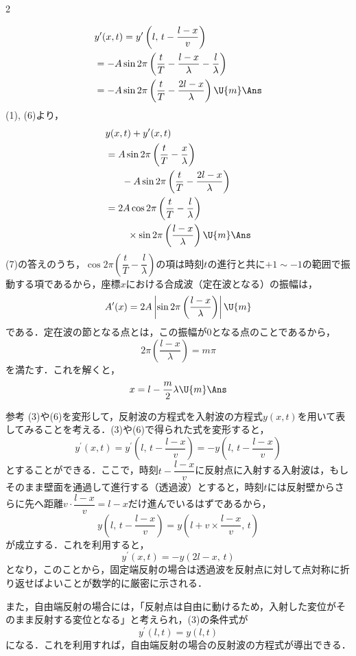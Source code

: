 \begin{multicols}{2}
\begin{komon}
       \[\begin{aligned}&y^\prime(x,t)=y^\prime\left(l,\,t-\frac{l-x}{v}\right)\\&=-A\sin 2\pi\left(\frac{t}{T}-\frac{l-x}{\lambda}-\frac{l}{\lambda}\right)\\&=-A\sin 2\pi\left(\frac{t}{T}-\frac{2l-x}{\lambda}\right)\U{m}\Ans\end{aligned}\]
 (1), (6)より，
       \[\begin{aligned}&y(x,t)+y^\prime(x,t)\\&=A\sin 2\pi\left(\frac{t}{T}-\frac{x}{\lambda}\right)\\&\hspace{6mm}-A\sin 2\pi\left(\frac{t}{T}-\frac{2l-x}{\lambda}\right)\\&=2A\cos 2\pi\left(\frac{t}{T}-\frac{l}{\lambda}\right)\\&\hspace{8mm}\times\sin 2\pi\left(\frac{l-x}{\lambda}\right)\U{m}\Ans\end{aligned}\]
 (7)の答えのうち，$\cos 2\pi\left(\dfrac{t}{T}-\dfrac{l}{\lambda}\right)$の項は時刻$t$の進行と共に$+1\sim-1$の範囲で振動する項であるから，座標$x$における合成波（定在波となる）の振幅は，
       \[A^\prime(x)=2A\left|\sin 2\pi\left(\frac{l-x}{\lambda}\right)\right|\U{m}\]
       である．定在波の節となる点とは，この振幅が0となる点のことであるから，
       \[2\pi\left(\frac{l-x}{\lambda}\right)=m\pi\]
       を満たす．これを解くと，
       \[x=l-\frac{m}{2}\lambda\U{m}\Ans\]
\end{komon}
\begin{bsHosoku}{参考}
(3)や(6)を変形して，反射波の方程式を入射波の方程式$y(x,t)$を用いて表してみることを考える．(3)や(6)で得られた式を変形すると，
\[y^\prime(x,t)=y^\prime\left(l,\,t-\frac{l-x}{v}\right)=-y\left(l,\,t-\frac{l-x}{v}\right)\]
とすることができる．ここで，時刻$t-\dfrac{l-x}{v}$に反射点に入射する入射波は，もしそのまま壁面を通過して進行する（透過波）とすると，時刻$t$には反射壁からさらに先へ距離$v\cdot\dfrac{l-x}{v}=l-x$だけ進んでいるはずであるから，
\[y\left(l,\,t-\frac{l-x}{v}\right)=y\left(l+v\times\frac{l-x}{v},\,t\right)\]
が成立する．これを利用すると，
\[y^\prime(x,t)=-y(2l-x,\,t)\]
となり，このことから，固定端反射の場合は透過波を反射点に対して点対称に折り返せばよいことが数学的に厳密に示される．

また，自由端反射の場合には，「反射点は自由に動けるため，入射した変位がそのまま反射する変位となる」と考えられ，(3)の条件式が
\[y^\prime(l,t)=y(l,t)\]
になる．これを利用すれば，自由端反射の場合の反射波の方程式が導出できる．
\end{bsHosoku}


\end{multicols}
